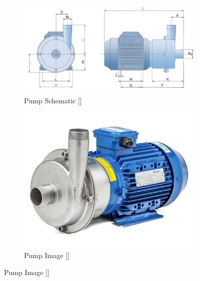 \begin{figure}[H]
    \centering
    \begin{subfigure}{0.49\linewidth}
        \includegraphics[width=\linewidth]{chapters/Z-support/figures/pump_schematic.PNG}
        \caption{Pump Schematic []}
    \end{subfigure}
    \begin{subfigure}{0.49\linewidth}
        \includegraphics[width=\linewidth]{chapters/Z-support/figures/pump_image.jpg}
        \caption{Pump Image []}
    \end{subfigure}
\end{figure}

